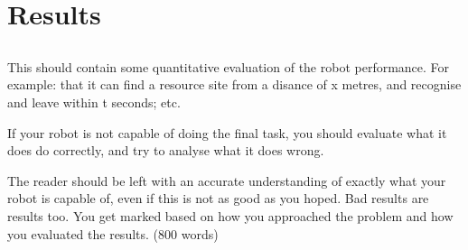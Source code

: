 \section{Results}

\subsection{}

This should contain some quantitative evaluation of the robot performance. For example: that it can find a resource site from a disance of x metres, and recognise and leave within t seconds; etc.

If your robot is not capable of doing the final task, you should evaluate what it does do correctly, and try to analyse what it does wrong.

The reader should be left with an accurate understanding of exactly what your robot is capable of, even if this is not as good as you hoped. Bad results are results too. You get marked based on how you approached the problem and how you evaluated the results. (800 words)


\subsection{}

\newpage
